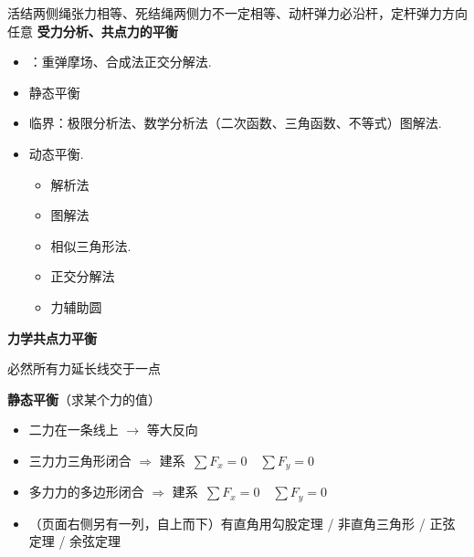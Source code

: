 活结两侧绳张力相等、死结绳两侧力不一定相等、动杆弹力必沿杆，定杆弹力方向任意
\textbf{受力分析、共点力的平衡}
\begin{itemize}
\item {}：重弹摩场、合成法\quad 正交分解法.
\item 静态平衡
\item 临界：极限分析法、数学分析法（二次函数、三角函数、不等式）\quad 图解法.
\item 动态平衡.
  \begin{itemize}
  \item 解析法
  \item 图解法
  \item 相似三角形法.
  \item 正交分解法
  \item 力辅助圆 %
  \end{itemize}
\end{itemize}
\textbf{力学\quad 共点力平衡}

必然\quad 所有力延长线交于一点

\medskip
\textbf{静态平衡}\quad （求某个力的值）
\begin{itemize}
\item 二力\quad 在一条线上 $\to$ 等大反向
\item 三力\quad 力三角形闭合 $\Rightarrow$ 建系\ $\sum F_x=0$\ \ $\sum F_y=0$
\item 多力\quad 力的多边形闭合 $\Rightarrow$ 建系\ $\sum F_x=0$\ \ $\sum F_y=0$
\item （页面右侧另有一列，自上而下）有直角用勾股定理 / 非直角三角形 / 正弦定理 / 余弦定理
\end{itemize}

